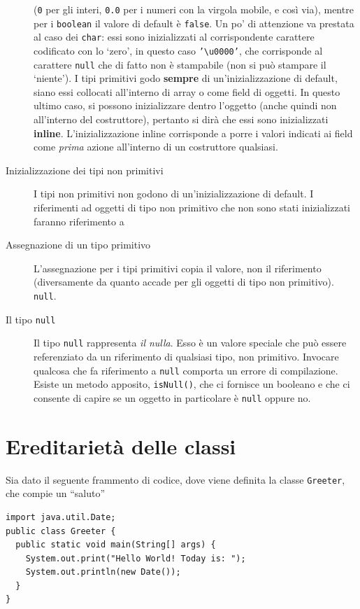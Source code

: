 \documentclass[\fontsizeclass,twocolumn]{\classname}
\theoremstyle{definition}
\theoremstyle{definition}
\begin{document}
\begin{description}
    (\texttt{0} per gli interi, \texttt{0.0} per i numeri con la virgola
    mobile, e così via), mentre per i \texttt{boolean} il valore di default è
    \texttt{false}. Un po' di attenzione va prestata al caso dei \texttt{char}:
    essi sono inizializzati al corrispondente carattere codificato con lo
    `zero', in questo caso \texttt{'\textbackslash u0000'}, che corrisponde al
    carattere \texttt{null} che di fatto non è stampabile (non si può stampare
    il `niente'). I tipi primitivi godo \textbf{sempre} di un'inizializzazione
    di default, siano essi collocati all'interno di array o come field di
    oggetti. In questo ultimo caso, si possono inizializzare dentro l'oggetto
    (anche quindi non all'interno del costruttore), pertanto si dirà che essi
    sono inizializzati \textbf{inline}. L'inizializzazione inline corrisponde a
    porre i valori indicati ai field come \emph{prima} azione all'interno di un
    costruttore qualsiasi.
\item[Inizializzazione dei tipi non primitivi] I tipi non primitivi non godono
    di un'inizializzazione di default. I riferimenti ad oggetti di tipo non
    primitivo che non sono stati inizializzati faranno riferimento a
\item[Assegnazione di un tipo primitivo] L'assegnazione per i tipi primitivi
    copia il valore, non il riferimento (diversamente da quanto accade per gli
    oggetti di tipo non primitivo).
    \texttt{null}.
\item[Il tipo \texttt{null}] Il tipo \texttt{null} rappresenta \emph{il nulla}.
    Esso è un valore speciale che può essere referenziato da un riferimento di
    qualsiasi tipo, non primitivo. Invocare qualcosa che fa riferimento a
    \texttt{null} comporta un errore di compilazione. Esiste un metodo
    apposito, \texttt{isNull()}, che ci fornisce un booleano e che ci consente
    di capire se un oggetto in particolare è \texttt{null} oppure no.
\end{description}


\chapter{Ereditarietà delle classi}

Sia dato il seguente frammento di codice, dove viene definita la
classe \texttt{Greeter}, che compie un ``saluto''

\begin{lstlisting}
import java.util.Date;
public class Greeter {
  public static void main(String[] args) {
    System.out.print("Hello World! Today is: ");
    System.out.println(new Date());
  }
}
\end{lstlisting}
\end{document}
